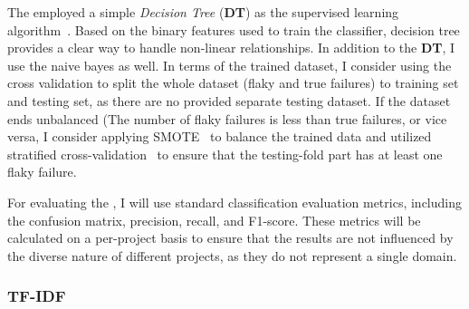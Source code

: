 



The \classifier employed a simple \emph{Decision Tree} (\textbf{DT}) as the supervised learning algorithm~\cite{DT}. Based on the binary features used to train the classifier, decision tree provides a clear way to handle non-linear relationships. In addition to the \textbf{DT}, I use the naive bayes as well. 
In terms of the trained dataset, I consider using the cross validation to split the whole dataset (flaky and true failures) to training set and testing set, as there are no provided separate testing dataset. If the dataset ends unbalanced (The number of flaky failures is less than true failures, or vice versa, I consider applying SMOTE~\cite{SMOTE} to balance the trained data and utilized stratified cross-validation~\cite{crossValidation} to ensure that the testing-fold part has at least one flaky failure. 


For evaluating the \classifier, I will use standard classification evaluation metrics, including the confusion matrix, precision, recall, and F1-score. 
These metrics will be calculated on a per-project basis to ensure that the results are not influenced by the diverse nature of different projects, as they do not represent a single domain.

\subsubsection{TF-IDF}
\label{sec:tfidf}


